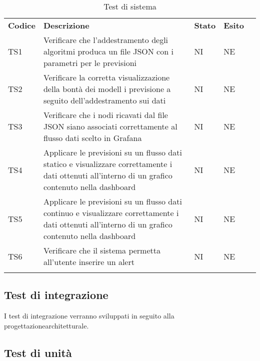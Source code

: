 \begin{longtable} {
		>{}p{15mm} 
		>{}p{79.5mm}
		>{}p{15mm} 
		>{}p{15mm}
		>{}p{0mm}}
	\rowcolor{gray!50}
	\textbf{Codice} & \textbf{Descrizione} & \textbf{Stato} & \textbf{Esito} &\TBstrut \\
	TS1 & Verificare che l'addestramento degli algoritmi produca un file JSON con i parametri per le previsioni & NI & NE  &\TBstrut \\ [2mm]
	TS2 & Verificare la corretta visualizzazione della bontà dei modell	i previsione a seguito dell'addestramento sui dati & NI & NE  &\TBstrut \\ [2mm]
	TS3 & Verificare che i nodi ricavati dal file JSON siano associati correttamente al flusso dati scelto in Grafana\glo & NI & NE  &\TBstrut \\ [2mm]
	TS4 & Applicare le previsioni su un flusso dati statico e visualizzare correttamente i dati ottenuti all'interno di un grafico contenuto nella dashboard\glo & NI & NE  &\TBstrut \\ [2mm]
	TS5 & Applicare le previsioni su un flusso dati continuo e visualizzare correttamente i dati ottenuti all'interno di un grafico contenuto nella dashboard\glo & NI & NE  &\TBstrut \\ [2mm]
	TS6 & Verificare che il sistema permetta all'utente inserire un alert\glo & NI & NE  &\TBstrut \\ [2mm]
	\rowcolor{white}
	\caption{Test di sistema}
\end{longtable}


\subsection{Test di integrazione}
I test di integrazione verranno sviluppati in seguito alla progettazione\glosp architetturale.

\subsection{Test di unità}

